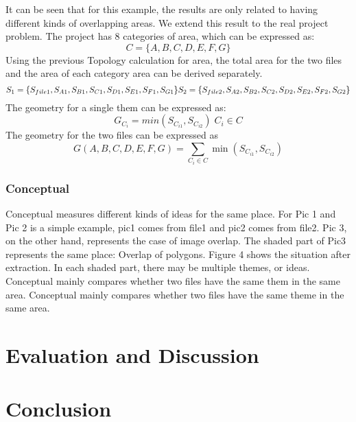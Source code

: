 It can be seen that for this example, the results are only related to having different kinds of overlapping areas. We extend this result to the real project problem. The project has 8 categories of area, which can be expressed as:
$$
C = \{A,B,C,D,E,F,G\}
$$
Using the previous Topology calculation for area, the total area for the two files and the area of each category area can be derived separately.
$$
S_1=\{S_{file1},S_{A1},S_{B1},S_{C1},S_{D1},S_{E1},S_{F1},S_{G1}\}\\
S_2=\{S_{file2},S_{A2},S_{B2},S_{C2},S_{D2},S_{E2},S_{F2},S_{G2}\}
$$
The geometry for a single them can be expressed as:
$$
G_{C_{i}}=min(S_{C_{i1}},S_{C_{i2}}) \;  C_i \in C 
$$
The geometry for the two files can be expressed as
$$
G(A,B,C,D,E,F,G) =  \sum\limits_{{C_i} \in C} {\min ({S_{{C_{i1}}}},{S_{{C_{i2}}}})} 
$$

\subsubsection*{Conceptual}
Conceptual measures different kinds of ideas for the same place. For Pic 1 and Pic 2 is a simple example, pic1 comes from file1 and pic2 comes from file2. Pic 3, on the other hand, represents the case of image overlap. The shaded part of Pic3 represents the same place: Overlap of polygons. Figure 4 shows the situation after extraction. In each shaded part, there may be multiple themes, or ideas. Conceptual mainly compares whether two files have the same them in the same area. Conceptual mainly compares whether two files have the same theme in the same area. 













\section*{Evaluation and Discussion}

\section*{Conclusion}







